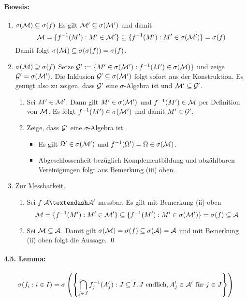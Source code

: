 \paragraph{Beweis:}
 \begin{enumerate}[label=\Roman*.]
     \item $\sigma(\mathcal{M})\subseteq\sigma(f)$\newline
     Es gilt $\mathcal{M}'\subseteq\sigma(\mathcal{M}')$ und damit 
     $$\mathcal{M}=\{f^{-1}(M'):M'\in\mathcal{M}'\}\subseteq\{f^{-1}(M'):M'\in\sigma(\mathcal{M}')\}=\sigma(f)$$
     Damit folgt $\sigma(\mathcal{M})\subseteq\sigma(\sigma(f))=\sigma(f)$.
     \item $\sigma(\mathcal{M})\supseteq\sigma(f)$\newline
     Setze $\mathcal{G}':=\{M'\in\sigma(\mathcal{M}'):f^{-1}(M')\in\sigma(\mathcal{M})\}$ und zeige $\mathcal{G}'=\sigma(\mathcal{M}')$. Die Inklusion $\mathcal{G}'\subseteq\nobreak\sigma(\mathcal{M}')$ folgt sofort aus der Konstruktion. Es gen\"ugt also zu zeigen, dass $\mathcal{G}'$ eine $\sigma$-Algebra ist und $\mathcal{M}'\subseteq\mathcal{G}'$.
     \begin{enumerate}[label=(\roman*)]
         \item Sei $M'\in\mathcal{M}'$. Dann gilt $M'\in\sigma(\mathcal{M}')$ und $f^{-1}(M')\in\mathcal{M}$ per Definition von $\mathcal{M}$. Es folgt $f^{-1}(M')\in\sigma(\mathcal{M}')$ und damit $M'\in\mathcal{G}'$.
         \item Zeige, dass $\mathcal{G}'$ eine $\sigma$-Algebra ist.
         \begin{itemize}
             \item Es gilt $\Omega'\in\sigma(\mathcal{M}')$ und $f^{-1}(\Omega')=\Omega\in\sigma(\mathcal{M})$.
             \item Abgeschlossenheit bez\"uglich Komplementbildung und abz\"ahlbaren Vereinigungen folgt aus Bemerkung (iii) oben.
         \end{itemize}
     \end{enumerate}
     \item Zur Messbarkeit.
     \begin{enumerate}[label=(\roman*)]
        \item Sei $f$ $\A\textendash\A'$-messbar. Es gilt mit Bemerkung (ii) oben
        $$\mathcal{M}=\{f^{-1}(M'):M'\in\mathcal{M}'\}\subseteq\{f^{-1}(M'):M'\in\sigma(\mathcal{M}')\}=\sigma(f)\subseteq\mathcal{A}$$
        \item Sei $\mathcal{M}\subseteq\mathcal{A}$. Damit gilt $\sigma(\mathcal{M})=\sigma(f)\subseteq\sigma(\mathcal{A})=\mathcal{A}$ und mit Bemerkung (ii) oben folgt die Aussage. \qed
     \end{enumerate}
 \end{enumerate}
 
 \paragraph{4.5. Lemma:}
 $$\sigma(f_i:i\in I)=\sigma\left(\left\{\bigcap_{j\in J}f_j^{-1}(A_j'):J\subseteq I, J\text{ endlich},A_j'\in\mathcal{A}'\text{ f\"ur }j\in J\right\}\right)$$
 
